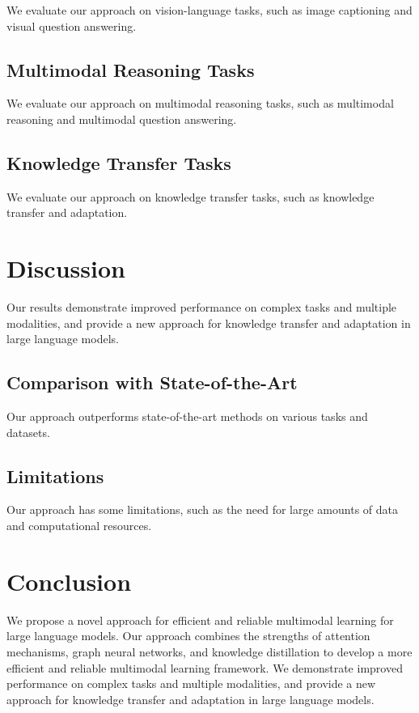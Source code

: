 \documentclass{article}
\begin{document}
We evaluate our approach on vision-language tasks, such as image captioning and visual question answering.

\subsection{Multimodal Reasoning Tasks}

We evaluate our approach on multimodal reasoning tasks, such as multimodal reasoning and multimodal question answering.

\subsection{Knowledge Transfer Tasks}

We evaluate our approach on knowledge transfer tasks, such as knowledge transfer and adaptation.

\section{Discussion}

Our results demonstrate improved performance on complex tasks and multiple modalities, and provide a new approach for knowledge transfer and adaptation in large language models.

\subsection{Comparison with State-of-the-Art}

Our approach outperforms state-of-the-art methods on various tasks and datasets.

\subsection{Limitations}

Our approach has some limitations, such as the need for large amounts of data and computational resources.

\section{Conclusion}

We propose a novel approach for efficient and reliable multimodal learning for large language models. Our approach combines the strengths of attention mechanisms, graph neural networks, and knowledge distillation to develop a more efficient and reliable multimodal learning framework. We demonstrate improved performance on complex tasks and multiple modalities, and provide a new approach for knowledge transfer and adaptation in large language models.
\end{document}
